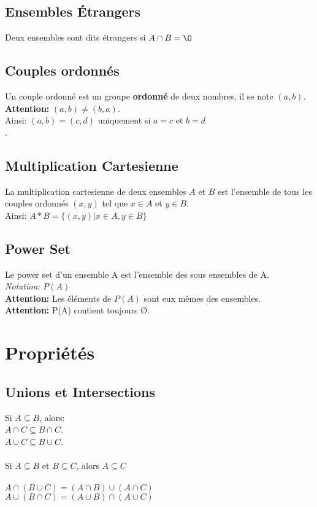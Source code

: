 \documentclass[12pt]{article}
\begin{document}
\subsection{Ensembles Étrangers}
Deux ensembles sont dits étrangers si $A \cap B = \O \\$ 

\subsection{Couples ordonnés}
Un couple ordonné est un groupe \textbf{ordonné} de deux nombres, il se note $(a,b)$.\\
\textbf{Attention:} $(a,b) \neq (b,a)$.\\
Ainsi: $(a,b) = (c,d)$ uniquement si $a = c$ et $b = d$ \\.

\subsection{Multiplication Cartesienne}
La multiplication cartesienne de deux ensembles $A$ et $B$ est l'ensemble de tous les couples ordonnés $(x,y)$ tel que $x \in A$ et $y \in B$.\\
Ainsi: $A*B = \{(x,y) | x \in A, y \in B \}$

\subsection{Power Set}
 Le power set d'un ensemble A est l'ensemble des sous ensembles de A.\\
 {\em Notation:} $P(A)$\\
 \textbf{Attention:} Les éléments de $P(A)$ sont eux mêmes des ensembles.\\
 \textbf{Attention:} P(A) contient toujours \O.\\
  

\section{Propriétés}
\subsection{Unions et Intersections}
Si $A \subseteq B$, alors:\\ 
$A \cap C \subseteq B \cap C$.\\
$A \cup C \subseteq B \cup C$.\\
\\
Si $A \subseteq B$ et $B \subseteq C$, alors $A \subseteq C$\\
\\
$A \cap (B \cup C) = (A \cap B) \cup (A \cap C)$\\
$A \cup (B \cap C) = (A \cup B) \cap (A \cup C)$\\
  
\end{document}
